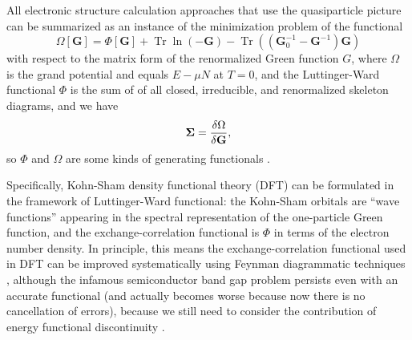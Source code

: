 \documentclass[hyperref, a4paper]{article}
\begin{document}
All electronic structure calculation approaches that use the quasiparticle picture 
can be summarized as an instance of the minimization problem 
of the functional 
\begin{equation}
    \Omega[\mathbf{G}]= \Phi[\mathbf{G}]+\operatorname{Tr} \ln (-\mathbf{G})-\operatorname{Tr}\left(\left(\mathbf{G}_0^{-1}-\mathbf{G}^{-1}\right) \mathbf{G}\right)
\end{equation}
with respect to the matrix form of the renormalized Green function $G$,
where $\Omega$ is the grand potential
and equals $E - \mu N$ at $T = 0$, 
and the Luttinger-Ward functional $\Phi$ 
is the sum of of all closed, irreducible, and renormalized skeleton diagrams,
and we have 
\begin{equation}
    \mathbf{\Sigma} = \fdv{\Omega}{\mathbf{G}}, 
\end{equation}
so $\Phi$ and $\Omega$ are some kinds of generating functionals
\cite{PhysRev.118.1417,potthoff2003self}.

Specifically, Kohn-Sham density functional theory (DFT) 
can be formulated in the framework of Luttinger-Ward functional: 
the Kohn-Sham orbitals are ``wave functions'' 
appearing in the spectral representation of the one-particle Green function,
and the exchange-correlation functional 
is $\Phi$ in terms of the electron number density.
In principle, 
this means the exchange-correlation functional used in DFT
can be improved systematically using Feynman diagrammatic techniques
\cite{aryasetiawan2002total,gruning2006density,haule2015free},
although the infamous semiconductor band gap problem
persists even with an accurate functional
(and actually becomes worse because now there is no cancellation of errors),
because we still need to consider the contribution of 
energy functional discontinuity
\cite{gruning2006density}.
\end{document}
